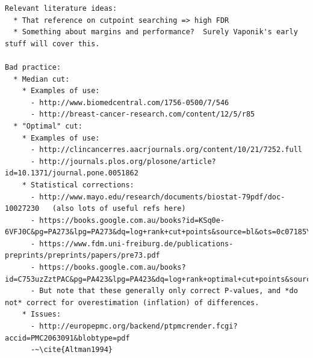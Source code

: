 \documentclass[dissertation.tex]{subfiles}
\begin{document}
\begin{verbatim}
Relevant literature ideas:
  * That reference on cutpoint searching => high FDR
  * Something about margins and performance?  Surely Vaponik's early stuff will cover this.

Bad practice:
  * Median cut:
    * Examples of use:
      - http://www.biomedcentral.com/1756-0500/7/546
      - http://breast-cancer-research.com/content/12/5/r85
  * "Optimal" cut: 
    * Examples of use: 
      - http://clincancerres.aacrjournals.org/content/10/21/7252.full
      - http://journals.plos.org/plosone/article?id=10.1371/journal.pone.0051862
    * Statistical corrections:
      - http://www.mayo.edu/research/documents/biostat-79pdf/doc-10027230   (also lots of useful refs here)
      - https://books.google.com.au/books?id=KSq0e-6VFJ0C&pg=PA273&lpg=PA273&dq=log+rank+cut+points&source=bl&ots=0c07185Yb1&sig=Y7g8m9U0LHepQr1FxjrJzE0_rv8&hl=en&sa=X&ei=Lj_6VJII1OPwBY7ZgZgE&ved=0CEEQ6AEwBg#v=onepage&q=log%20rank%20cut%20points&f=false
      - https://www.fdm.uni-freiburg.de/publications-preprints/preprints/papers/pre73.pdf
      - https://books.google.com.au/books?id=C753uzZztPAC&pg=PA423&lpg=PA423&dq=log+rank+optimal+cut+points&source=bl&ots=__ay7uRwZ4&sig=e4IF1oKV71mw8XYU5qUiSl7JQ3g&hl=en&sa=X&ei=1z_6VOu1CImG8QW4o4LQAw&ved=0CFcQ6AEwCA#v=onepage&q=log%20rank%20optimal%20cut%20points&f=false
      - But note that these generally only correct P-values, and *do not* correct for overestimation (inflation) of differences.
    * Issues: 
      - http://europepmc.org/backend/ptpmcrender.fcgi?accid=PMC2063091&blobtype=pdf
      -~\cite{Altman1994}
\end{verbatim}

\begin{algorithm}

  \label{alg:mess_messina1}
  \caption{Messina1}
\end{algorithm}
\end{document}
